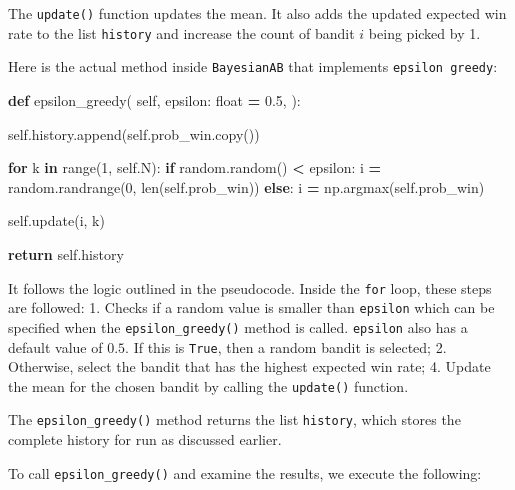 \documentclass[
]{book}
\newenvironment{Shaded}{\begin{snugshade}}{\end{snugshade}}
\newcommand{\BuiltInTok}[1]{#1}
\newcommand{\ControlFlowTok}[1]{\textcolor[rgb]{0.13,0.29,0.53}{\textbf{#1}}}
\newcommand{\DecValTok}[1]{\textcolor[rgb]{0.00,0.00,0.81}{#1}}
\newcommand{\FloatTok}[1]{\textcolor[rgb]{0.00,0.00,0.81}{#1}}
\newcommand{\KeywordTok}[1]{\textcolor[rgb]{0.13,0.29,0.53}{\textbf{#1}}}
\newcommand{\NormalTok}[1]{#1}
\newcommand{\OperatorTok}[1]{\textcolor[rgb]{0.81,0.36,0.00}{\textbf{#1}}}
\newcommand{\VariableTok}[1]{\textcolor[rgb]{0.00,0.00,0.00}{#1}}
\theoremstyle{definition}
\theoremstyle{definition}
\theoremstyle{definition}
\theoremstyle{definition}
\theoremstyle{remark}
\begin{document}
The \texttt{update()} function updates the mean. It also adds the updated expected win rate to the list \texttt{history} and increase the count of bandit \(i\) being picked by 1.

Here is the actual method inside \texttt{BayesianAB} that implements \texttt{epsilon\ greedy}:

\begin{Shaded}
\begin{Highlighting}[]
    \KeywordTok{def}\NormalTok{ epsilon\_greedy(}
            \VariableTok{self}\NormalTok{,}
\NormalTok{            epsilon: }\BuiltInTok{float} \OperatorTok{=} \FloatTok{0.5}\NormalTok{,}
\NormalTok{    ):}

        \VariableTok{self}\NormalTok{.history.append(}\VariableTok{self}\NormalTok{.prob\_win.copy())}

        \ControlFlowTok{for}\NormalTok{ k }\KeywordTok{in} \BuiltInTok{range}\NormalTok{(}\DecValTok{1}\NormalTok{, }\VariableTok{self}\NormalTok{.N):}
            \ControlFlowTok{if}\NormalTok{ random.random() }\OperatorTok{\textless{}}\NormalTok{ epsilon:}
\NormalTok{                i }\OperatorTok{=}\NormalTok{ random.randrange(}\DecValTok{0}\NormalTok{, }\BuiltInTok{len}\NormalTok{(}\VariableTok{self}\NormalTok{.prob\_win))}
            \ControlFlowTok{else}\NormalTok{:}
\NormalTok{                i }\OperatorTok{=}\NormalTok{ np.argmax(}\VariableTok{self}\NormalTok{.prob\_win)}

            \VariableTok{self}\NormalTok{.update(i, k)}

        \ControlFlowTok{return} \VariableTok{self}\NormalTok{.history}
\end{Highlighting}
\end{Shaded}

It follows the logic outlined in the pseudocode. Inside the \texttt{for} loop, these steps are followed:
1. Checks if a random value is smaller than \texttt{epsilon} which can be specified when the \texttt{epsilon\_greedy()} method is called. \texttt{epsilon} also has a default value of \(0.5\). If this is \texttt{True}, then a random bandit is selected;
2. Otherwise, select the bandit that has the highest expected win rate;
4. Update the mean for the chosen bandit by calling the \texttt{update()} function.

The \texttt{epsilon\_greedy()} method returns the list \texttt{history}, which stores the complete history for run as discussed earlier.

To call \texttt{epsilon\_greedy()} and examine the results, we execute the following:
\end{document}
